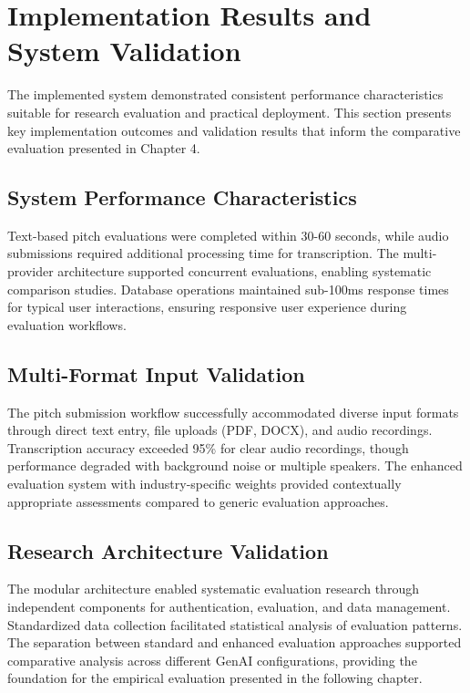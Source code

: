 \section{Implementation Results and System Validation}
\label{sec:results}

The implemented system demonstrated consistent performance characteristics suitable for research evaluation and practical deployment. This section presents key implementation outcomes and validation results that inform the comparative evaluation presented in Chapter 4.

\subsection{System Performance Characteristics}
\label{subsec:performance}

Text-based pitch evaluations were completed within 30-60 seconds, while audio submissions required additional processing time for transcription. The multi-provider architecture supported concurrent evaluations, enabling systematic comparison studies. Database operations maintained sub-100ms response times for typical user interactions, ensuring responsive user experience during evaluation workflows.

\subsection{Multi-Format Input Validation}
\label{subsec:input-validation}

The pitch submission workflow successfully accommodated diverse input formats through direct text entry, file uploads (PDF, DOCX), and audio recordings. Transcription accuracy exceeded 95\% for clear audio recordings, though performance degraded with background noise or multiple speakers. The enhanced evaluation system with industry-specific weights provided contextually appropriate assessments compared to generic evaluation approaches.

\subsection{Research Architecture Validation}
\label{subsec:research-validation}

The modular architecture enabled systematic evaluation research through independent components for authentication, evaluation, and data management. Standardized data collection facilitated statistical analysis of evaluation patterns. The separation between standard and enhanced evaluation approaches supported comparative analysis across different GenAI configurations, providing the foundation for the empirical evaluation presented in the following chapter.
